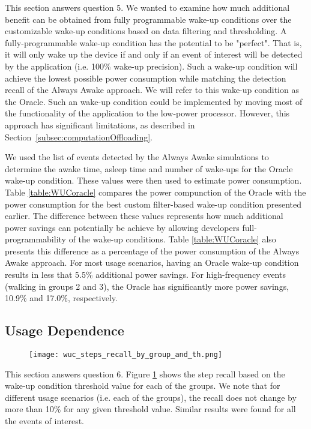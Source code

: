 This section answers question 5. We wanted to examine how much additional benefit can be obtained from fully programmable wake-up conditions over the customizable wake-up conditions based on data filtering and thresholding. A fully-programmable wake-up condition has the potential to be "perfect". That is, it will only wake up the device if and only if an event of interest will be detected by the application (i.e. 100\% wake-up precision). Such a wake-up condition will achieve the lowest possible power consumption while matching the detection recall of the Always Awake approach. We will refer to this wake-up condition as the Oracle. Such an wake-up condition could be implemented by moving most of the functionality of the application to the low-power processor. However, this approach has significant limitations, as described in Section~\ref{subsec:computationOffloading}.

We used the list of events detected by the Always Awake simulations to determine the awake time, asleep time and number of wake-ups for the Oracle wake-up condition. These values were then used to estimate power consumption. Table \ref{table:WUCoracle} compares the power compunction of the Oracle with the power consumption for the best custom filter-based wake-up condition presented earlier. The difference between these values represents how much additional power savings can potentially be achieve by allowing developers full-programmability of the wake-up conditions. Table \ref{table:WUCoracle} also presents this difference as a percentage of the power consumption of the Always Awake approach. For most usage scenarios, having an Oracle wake-up condition results in less that 5.5\% additional power savings. For high-frequency events (walking in groups 2 and 3), the Oracle has significantly more power savings, 10.9\% and 17.0\%, respectively.

\subsection{Usage Dependence}

\begin{figure}[h]
	\texttt{[image: wuc\_steps\_recall\_by\_group\_and\_th.png]}
	\caption{}
    \label{fig:wucStepsRecallByGroupAndThreshold}
\end{figure}

This section answers question 6. Figure \ref{fig:wucStepsRecallByGroupAndThreshold} shows the step recall based on the wake-up condition threshold value for each of the groups. We note that for different usage scenarios (i.e. each of the groups), the recall does not change by more than 10\% for any given threshold value. Similar results were found for all the events of interest. 

